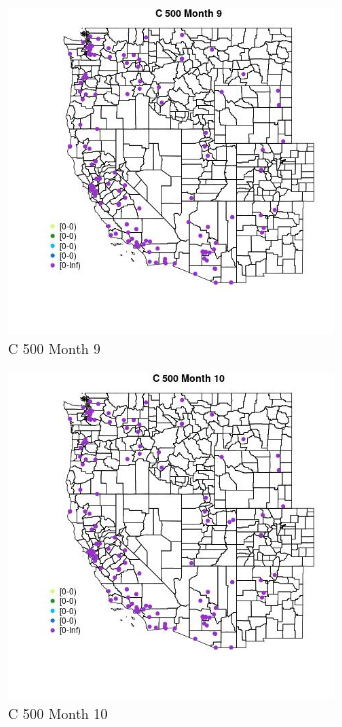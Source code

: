\begin{figure} 
\centering  
\includegraphics[width=0.77\textwidth]{Code_Outputs/Report_ML_input_PM25_Step4_part_e_de_duplicated_aves_MapObsMo9C_500.jpg} 
\caption{\label{fig:Report_ML_input_PM25_Step4_part_e_de_duplicated_avesMapObsMo9C_500}C 500 Month 9} 
\end{figure} 
 

\begin{figure} 
\centering  
\includegraphics[width=0.77\textwidth]{Code_Outputs/Report_ML_input_PM25_Step4_part_e_de_duplicated_aves_MapObsMo10C_500.jpg} 
\caption{\label{fig:Report_ML_input_PM25_Step4_part_e_de_duplicated_avesMapObsMo10C_500}C 500 Month 10} 
\end{figure} 
 

